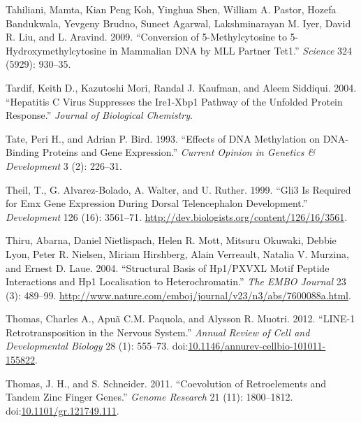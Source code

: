 \documentclass[onehalf,12pt]{beavtex}
\begin{document}
  \hypertarget{ref-TahilianiConversion5methylcytosine5hydroxymethylcytosine2009}{}
  Tahiliani, Mamta, Kian Peng Koh, Yinghua Shen, William A. Pastor, Hozefa
  Bandukwala, Yevgeny Brudno, Suneet Agarwal, Lakshminarayan M. Iyer,
  David R. Liu, and L. Aravind. 2009. ``Conversion of 5-Methylcytosine to
  5-Hydroxymethylcytosine in Mammalian DNA by MLL Partner Tet1.''
  \emph{Science} 324 (5929): 930--35.
  
  \hypertarget{ref-TardifHepatitisvirussuppresses2004}{}
  Tardif, Keith D., Kazutoshi Mori, Randal J. Kaufman, and Aleem Siddiqui.
  2004. ``Hepatitis C Virus Suppresses the Ire1-Xbp1 Pathway of the
  Unfolded Protein Response.'' \emph{Journal of Biological Chemistry}.
  
  \hypertarget{ref-TateEffectsDNAmethylation1993}{}
  Tate, Peri H., and Adrian P. Bird. 1993. ``Effects of DNA Methylation on
  DNA-Binding Proteins and Gene Expression.'' \emph{Current Opinion in
  Genetics \& Development} 3 (2): 226--31.
  
  \hypertarget{ref-TheilGli3requiredEmx1999}{}
  Theil, T., G. Alvarez-Bolado, A. Walter, and U. Ruther. 1999. ``Gli3 Is
  Required for Emx Gene Expression During Dorsal Telencephalon
  Development.'' \emph{Development} 126 (16): 3561--71.
  \url{http://dev.biologists.org/content/126/16/3561}.
  
  \hypertarget{ref-ThiruStructuralbasisHP12004}{}
  Thiru, Abarna, Daniel Nietlispach, Helen R. Mott, Mitsuru Okuwaki,
  Debbie Lyon, Peter R. Nielsen, Miriam Hirshberg, Alain Verreault,
  Natalia V. Murzina, and Ernest D. Laue. 2004. ``Structural Basis of
  Hp1/PXVXL Motif Peptide Interactions and Hp1 Localisation to
  Heterochromatin.'' \emph{The EMBO Journal} 23 (3): 489--99.
  \url{http://www.nature.com/emboj/journal/v23/n3/abs/7600088a.html}.
  
  \hypertarget{ref-ThomasLINE1RetrotranspositionNervous2012}{}
  Thomas, Charles A., Apuã C.M. Paquola, and Alysson R. Muotri. 2012.
  ``LINE-1 Retrotransposition in the Nervous System.'' \emph{Annual Review
  of Cell and Developmental Biology} 28 (1): 555--73.
  doi:\href{https://doi.org/10.1146/annurev-cellbio-101011-155822}{10.1146/annurev-cellbio-101011-155822}.
  
  \hypertarget{ref-ThomasCoevolutionretroelementstandem2011}{}
  Thomas, J. H., and S. Schneider. 2011. ``Coevolution of Retroelements
  and Tandem Zinc Finger Genes.'' \emph{Genome Research} 21 (11):
  1800--1812.
  doi:\href{https://doi.org/10.1101/gr.121749.111}{10.1101/gr.121749.111}.
  
\end{document}
